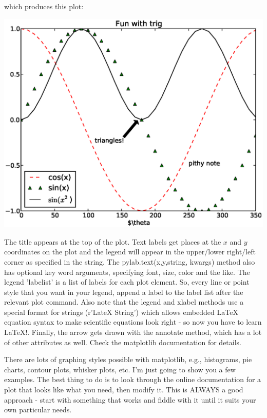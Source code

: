 \documentclass[11pt]{book}
\begin{document}
{{{{\noindent which produces this plot:

\includegraphics[width=15cm]{EPSfiles/matplotlib4.eps}

The title appears at the top of the plot.
    Text labels get places at the $x$ and $y$ coordinates on the plot and the legend will appear in the upper/lower right/left corner as specified in the string.  The {\color{blue}pylab.text(x,y,string, kwargs)} method also has optional key word arguments, specifying font, size, color and the like.     The legend 'labelist' is a list of labels for each plot element.  So, every line or point style that you want in your legend, append a label to the label list after the relevant plot command. Also note that the legend and xlabel methods use  a special format for strings ({\color{blue}r'LateX String')} which allows embedded LaTeX equation syntax  to make scientific equations look right - so now you have to learn LaTeX!.   Finally, the arrow gets drawn with the {\color{blue}annotate} method, which has a lot of other attributes as well.
Check the {\color{blue}matplotlib} documentation for details.





There are lots of graphing styles possible with {\color{blue}matplotlib}, e.g., histograms, pie charts, contour plots, whisker plots, etc.  I'm just going to show you a few examples.  The best thing to do is to look through the online documentation for a plot that looks like what you need, then modify it.  This is ALWAYS a good approach - start with something that works and fiddle with it until it suits your own particular needs.

}}}}
\end{document}
